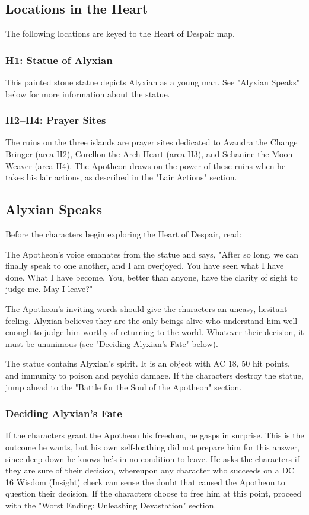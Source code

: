 \documentclass[10pt,a4paper,twoside,bg=print,twocolumn,openany,nodeprecatedcode]{dndbook}
\begin{document}
\subsection{Locations in the Heart}
The following locations are keyed to the Heart of Despair map.

\subsubsection{H1: Statue of Alyxian}
This painted stone statue depicts Alyxian as a young man. See "Alyxian Speaks" below for more information about the statue.

\subsubsection{H2–H4: Prayer Sites}
The ruins on the three islands are prayer sites dedicated to Avandra the Change Bringer (area H2), Corellon the Arch Heart (area H3), and Sehanine the Moon Weaver (area H4). The Apotheon draws on the power of these ruins when he takes his lair actions, as described in the "Lair Actions" section.

\subsection{Alyxian Speaks}
Before the characters begin exploring the Heart of Despair, read:

\begin{DndReadAloud}{}
The Apotheon's voice emanates from the statue and says, "After so long, we can finally speak to one another, and I am overjoyed. You have seen what I have done. What I have become. You, better than anyone, have the clarity of sight to judge me. May I leave?"

\end{DndReadAloud}

The Apotheon's inviting words should give the characters an uneasy, hesitant feeling. Alyxian believes they are the only beings alive who understand him well enough to judge him worthy of returning to the world. Whatever their decision, it must be unanimous (see "Deciding Alyxian's Fate" below).

The statue contains Alyxian's spirit. It is an object with AC 18, 50 hit points, and immunity to poison and psychic damage. If the characters destroy the statue, jump ahead to the "Battle for the Soul of the Apotheon" section.

\subsubsection{Deciding Alyxian's Fate}
If the characters grant the Apotheon his freedom, he gasps in surprise. This is the outcome he wants, but his own self-loathing did not prepare him for this answer, since deep down he knows he's in no condition to leave. He asks the characters if they are sure of their decision, whereupon any character who succeeds on a DC 16 Wisdom (Insight) check can sense the doubt that caused the Apotheon to question their decision. If the characters choose to free him at this point, proceed with the "Worst Ending: Unleashing Devastation" section.
\end{document}
